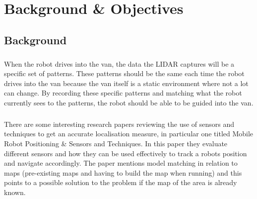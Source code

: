 \chapter{Background \& Objectives}

%
%
%
%

\section{Background}
\paragraph{}
When the robot drives into the van, the data the LIDAR captures will be a specific set of patterns. These patterns should be the same each time the robot drives into the van because the van itself is a static environment where not a lot can change. By recording these specific patterns and matching what the robot currently sees to the patterns, the robot should be able to be guided into the van.
\paragraph{}
There are some interesting research papers reviewing the use of sensors and techniques to get an accurate localisation measure, in particular one titled Mobile Robot Positioning {\&} Sensors and Techniques\cite{Borenstein}. In this paper they evaluate different sensors and how they can be used effectively to track a robots position and navigate accordingly. The paper mentions model matching in relation to maps (pre-existing maps and having to build the map when running) and this points to a possible solution to the problem if the map of the area is already known.
